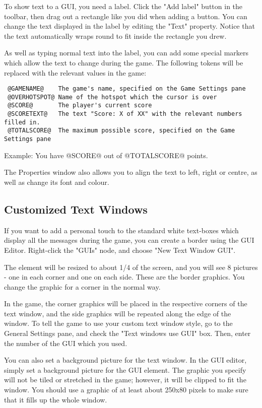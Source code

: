 To show text to a GUI, you need a label. Click the "Add label" button in the
toolbar, then drag out a rectangle like you did when adding a button. You can change the
text displayed in the label by editing the "Text" property. Notice that the
text automatically wraps round to fit inside the rectangle you drew.

As well as typing normal text into the label, you can add some special markers
which allow the text to change during the game. The following tokens will be
replaced with the relevant values in the game:
\begin{verbatim}
 @GAMENAME@    The game's name, specified on the Game Settings pane
 @OVERHOTSPOT@ Name of the hotspot which the cursor is over
 @SCORE@       The player's current score
 @SCORETEXT@   The text "Score: X of XX" with the relevant numbers filled in.
 @TOTALSCORE@  The maximum possible score, specified on the Game Settings pane
\end{verbatim}
Example: You have @SCORE@ out of @TOTALSCORE@ points.

The Properties window also allows you to align the text to left, right or
centre, as well as change its font and colour.

\subsection{Customized Text Windows}\label{TextWin}%

If you want to add a personal touch to the standard white text-boxes which
display all the messages during the game, you can create a border using the
GUI Editor. Right-click the "GUIs" node, and choose "New Text Window GUI".

The element will be resized to about 1/4 of the screen, and you will see 8
pictures - one in each corner and one on each side. These are the border
graphics. You change the graphic for a corner in the normal way.

In the game, the corner graphics will be placed in the respective corners of
the text window, and the side graphics will be repeated along the edge of
the window. To tell the game to use your custom text window style, go to the
General Settings pane, and check the "Text windows use GUI" box. Then, enter
the number of the GUI which you used.

You can also set a background picture for the text window. In the GUI editor,
simply set a background picture for the GUI element. The graphic you specify
will not be tiled or stretched in the game; however, it will be clipped to
fit the window. You should use a graphic of at least about 250x80 pixels to
make sure that it fills up the whole window.

